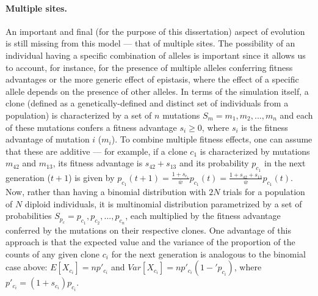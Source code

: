 \paragraph{Multiple sites.} An important and final (for the purpose of this dissertation) aspect of evolution is still missing from this model --- that of multiple sites. The possibility of an individual having a specific combination of alleles is important since it allows us to account, for instance, for the presence of multiple alleles conferring fitness advantages or the more generic effect of epistasis, where the effect of a specific allele depends on the presence of other alleles. In terms of the simulation itself, a clone (defined as a genetically-defined and distinct set of individuals from a population) is characterized by a set of $n$ mutations $S_{m} = {m_1,m_2,...,m_n}$ and each of these mutations confers a fitness advantage $s_i \geq 0$, where $s_i$ is the fitness advantage of mutation $i$ ($m_i$). To combine multiple fitness effects, one can assume that these are additive --- for example, if a clone $c_1$ is characterized by mutations $m_{42}$ and $m_{13}$, its fitness advantage is $s_{42} + s_{13}$ and its probability $p_{c_1}$ in the next generation ($t+1$) is given by $p_{c_1}(t+1) = \frac{1+s_{c_1}}{\bar{w}}p_{c_1}(t) = \frac{1+s_{42}+s_{13}}{\bar{w}}p_{c_1}(t)$. Now, rather than having a binomial distribution with $2N$ trials for a population of $N$ diploid individuals, it is multinomial distribution parametrized by a set of probabilities $S_{p_c} = {p_{c_1},p_{c_2},...,p_{c_n}}$, each multiplied by the fitness advantage conferred by the mutations on their respective clones. One advantage of this approach is that the expected value and the variance of the proportion of the counts of any given clone $c_i$ for the next generation is analogous to the binomial case above: $E[X_{c_i}] = np'_{c_i}$ and $Var[X_{c_i}] = np'_{c_i}(1-'p_{c_i})$, where $p'_{c_i} = (1+s_{c_i})p_{c_i}$. 

